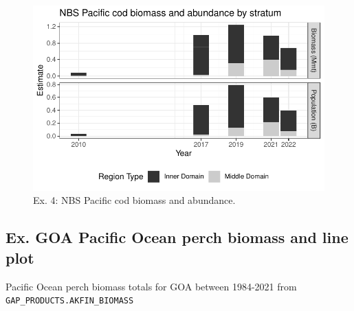 \documentclass[
  letterpaper,
  oneside,
  open=any]{scrbook}
\begin{document}
\begin{figure}[H]

{\centering \includegraphics{content/akfin-oracle-sql-r_files/figure-pdf/test-4-fig-1.pdf}

}

\caption{Ex. 4: NBS Pacific cod biomass and abundance.}

\end{figure}

\hypertarget{ex.-goa-pacific-ocean-perch-biomass-and-line-plot}{%
\subsection{Ex. GOA Pacific Ocean perch biomass and line
plot}\label{ex.-goa-pacific-ocean-perch-biomass-and-line-plot}}

Pacific Ocean perch biomass totals for GOA between 1984-2021 from
\texttt{GAP\_PRODUCTS.AKFIN\_BIOMASS}
\end{document}

